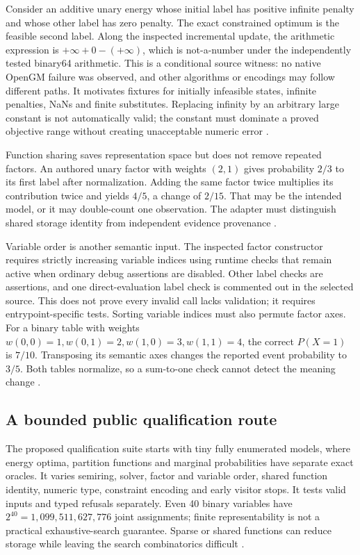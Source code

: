 Consider an additive unary energy whose initial label has positive infinite
penalty and whose other label has zero penalty. The exact constrained
optimum is the feasible second label. Along the inspected incremental
update, the arithmetic expression is $+\infty+0-(+\infty)$, which is
not-a-number under the independently tested binary64 arithmetic. This is a
conditional source witness: no native OpenGM failure was observed, and
other algorithms or encodings may follow different paths. It motivates
fixtures for initially infeasible states, infinite penalties, NaNs and
finite substitutes. Replacing infinity by an arbitrary large constant is
not automatically valid; the constant must dominate a proved objective
range without creating unacceptable numeric error
\citep{exec24_opengm_source,exec24_opengm_choice}.

Function sharing saves representation space but does not remove repeated
factors. An authored unary factor with weights $(2,1)$ gives probability
$2/3$ to its first label after normalization. Adding the same factor twice
multiplies its contribution twice and yields $4/5$, a change of $2/15$.
That may be the intended model, or it may double-count one observation.
The adapter must distinguish shared storage identity from independent
evidence provenance \citep{exec24_opengm_paper,exec24_opengm_choice}.

Variable order is another semantic input. The inspected factor constructor
requires strictly increasing variable indices using runtime checks that
remain active when ordinary debug assertions are disabled. Other label
checks are assertions, and one direct-evaluation label check is commented
out in the selected source. This does not prove every invalid call lacks
validation; it requires entrypoint-specific tests. Sorting variable indices
must also permute factor axes. For a binary table with weights
$w(0,0)=1,w(0,1)=2,w(1,0)=3,w(1,1)=4$, the correct $P(X=1)$ is $7/10$.
Transposing its semantic axes changes the reported event probability to
$3/5$. Both tables normalize, so a sum-to-one check cannot detect the
meaning change \citep{exec24_opengm_source,exec24_opengm_choice}.

\subsection{A bounded public qualification route}
The proposed qualification suite starts with tiny fully enumerated models,
where energy optima, partition functions and marginal probabilities have
separate exact oracles. It varies semiring, solver, factor and variable
order, shared function identity, numeric type, constraint encoding and
early visitor stops. It tests valid inputs and typed refusals separately.
Even 40 binary variables have $2^{40}=1{,}099{,}511{,}627{,}776$ joint
assignments; finite representability is not a practical exhaustive-search
guarantee. Sparse or shared functions can reduce storage while leaving
the search combinatorics difficult \citep{exec24_opengm_choice}.

